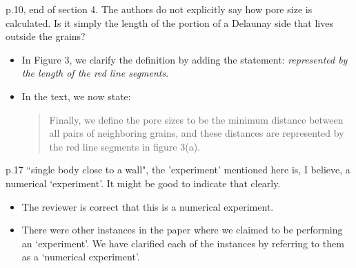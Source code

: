 \documentclass[11pt]{article}
\newcommand{\comment}[1]{{\color{blue} #1}}
\begin{document}
\noindent
\comment{p.10, end of section 4.  The authors do not explicitly say how
pore size is calculated.  Is it simply the length of the portion of a
Delaunay side that lives outside the grains?}
\begin{itemize}
 \item In Figure 3, we clarify the definition by adding the statement:
    {\em represented by the length of the red line segments}.
  \item In the text, we now state:
    \begin{quotation}
    \noindent
      Finally, we define the pore sizes to be the minimum distance
      between all pairs of neighboring grains, and these distances are
      represented by the red line segments in figure 3(a).
    \end{quotation}
\end{itemize}

\noindent
\comment{p.17 ``single body close to a wall", the 'experiment' mentioned
here is, I believe, a numerical `experiment'.  It might be good to
indicate that clearly.}
\begin{itemize}
  \item The reviewer is correct that this is a numerical experiment.

  \item There were other instances in the paper where we claimed to be
    performing an `experiment'. We have clarified each of the instances
    by referring to them as a `numerical experiment'.
\end{itemize}
\end{document}
